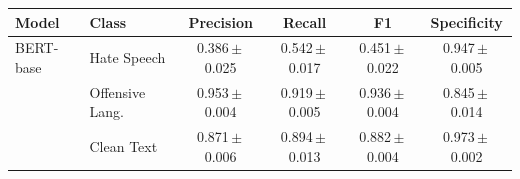 \begin{tabular}{llcccc}
\toprule
Model & Class & Precision & Recall & F1 & Specificity \\
\midrule
BERT-base & Hate Speech & 0.386\,$\pm$\,0.025 & 0.542\,$\pm$\,0.017 & 0.451\,$\pm$\,0.022 & 0.947\,$\pm$\,0.005 \\
 & Offensive Lang. & 0.953\,$\pm$\,0.004 & 0.919\,$\pm$\,0.005 & 0.936\,$\pm$\,0.004 & 0.845\,$\pm$\,0.014 \\
 & Clean Text & 0.871\,$\pm$\,0.006 & 0.894\,$\pm$\,0.013 & 0.882\,$\pm$\,0.004 & 0.973\,$\pm$\,0.002 \\
\bottomrule
\end{tabular}
